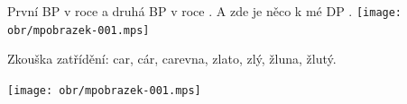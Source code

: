 \documentclass[12pt]{article}
\begin{document}
První BP   \cite{Zouvala2018thesis} v roce \citeyear{Zouvala2018thesis} a druhá BP   \cite{Zouvala2020thesis} v roce \citeyear{Zouvala2020thesis}.
A zde je něco k mé DP  \cite{li2009haad}. \texttt{[image: obr/mpobrazek-001.mps]}

Zkouška zatřídění: car, cár, carevna,
                       zlato, zlý, žluna,
                       žlutý.


\texttt{[image: obr/mpobrazek-001.mps]}


\printindex

\printbibliography[title = {Seznam bibliografických citací}] 
\end{document}
